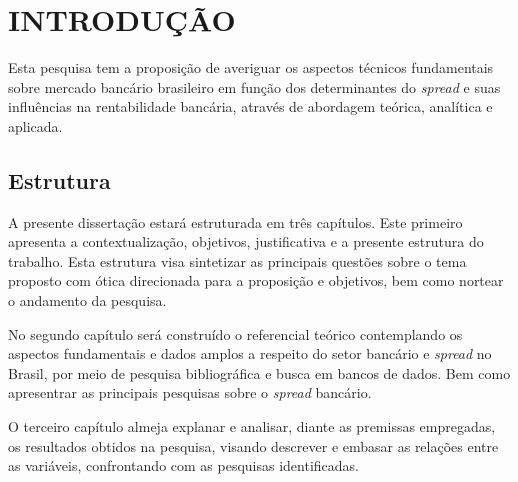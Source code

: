 \documentclass[
  12pt,
  12pt,
  openright,
  oneside,
  a4paper,
  chapter=TITLE,
  section=TITLE,
  subsection=TITLE,
  subsubsection=TITLE,
  english,
  portugues,
  sumario=tradicional]{abntex2}
\begin{document}






\textual
\pagestyle{simple}
\parindent 1.50cm

\chapter[INTRODUÇÃO]{INTRODUÇÃO}

Esta pesquisa tem a proposição de averiguar os aspectos técnicos fundamentais sobre mercado bancário brasileiro em função dos determinantes do \emph{spread} e suas influências na rentabilidade bancária, através de abordagem teórica, analítica e aplicada.

\section{Estrutura}

A presente dissertação estará estruturada em três capítulos. Este primeiro apresenta a contextualização, objetivos, justificativa e a presente estrutura do trabalho. Esta estrutura visa sintetizar as principais questões sobre o tema proposto com ótica direcionada para a proposição e objetivos, bem como nortear o andamento da pesquisa.

No segundo capítulo será construído o referencial teórico contemplando os aspectos fundamentais e dados amplos a respeito do setor bancário e \emph{spread} no Brasil, por meio de pesquisa bibliográfica e busca em bancos de dados. Bem como apresentrar as principais pesquisas sobre o \emph{spread} bancário.

O terceiro capítulo almeja explanar e analisar, diante as premissas empregadas, os resultados obtidos na pesquisa, visando descrever e embasar as relações entre as variáveis, confrontando com as pesquisas identificadas.
\end{document}
